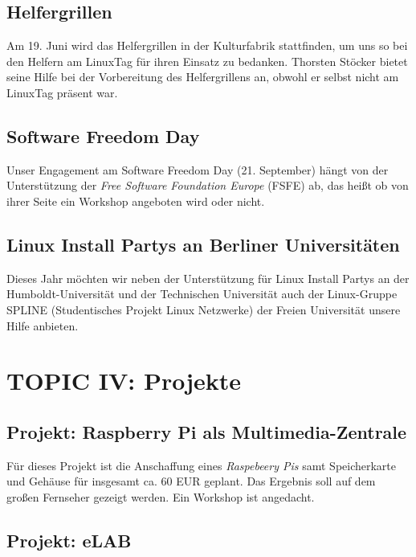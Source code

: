 \documentclass[11pt,a4paper,ngerman]{article}
\begin{document}
  \subsection{Helfergrillen}
  
Am 19. Juni wird das Helfergrillen in der Kulturfabrik stattfinden, um uns so 
bei den Helfern am LinuxTag für ihren Einsatz zu bedanken. Thorsten Stöcker 
bietet seine Hilfe bei der Vorbereitung des Helfergrillens an, obwohl er 
selbst nicht am LinuxTag präsent war.



  \subsection{Software Freedom Day}
  
Unser Engagement am Software Freedom Day (21. September) hängt von der 
Unterstützung der \emph{Free Software Foundation Europe} (FSFE) ab, das heißt 
ob von ihrer Seite ein Workshop angeboten wird oder nicht.


  \subsection{Linux Install Partys an Berliner Universitäten}

Dieses Jahr möchten wir neben der Unterstützung für Linux Install Partys an der 
Humboldt-Universität und der Technischen Universität auch der Linux-Gruppe 
SPLINE (Studentisches Projekt Linux Netzwerke) der Freien Universität unsere 
Hilfe anbieten.


\section{TOPIC IV: Projekte}


  \subsection{Projekt: Raspberry Pi als Multimedia-Zentrale}
  
Für dieses Projekt ist die Anschaffung eines \emph{Raspebeery Pis} samt 
Speicherkarte und Gehäuse für insgesamt ca. 60 EUR geplant. Das Ergebnis soll 
auf dem großen Fernseher gezeigt werden. Ein Workshop ist angedacht.


  \subsection{Projekt: eLAB}
  
\end{document}
